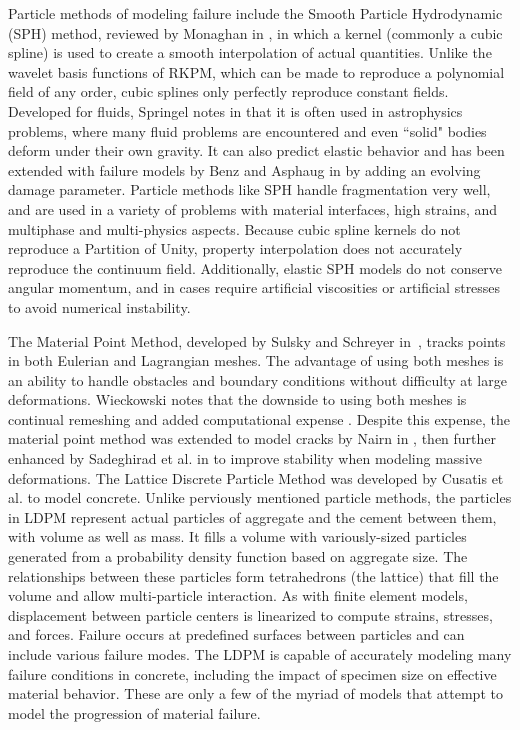 Particle methods of modeling failure include the Smooth Particle Hydrodynamic (SPH) method, reviewed by Monaghan in \cite{monaghan2005smoothed}, in which a kernel (commonly a cubic spline) is used to create a smooth interpolation of actual quantities.
Unlike the wavelet basis functions of RKPM, which can be made to reproduce a polynomial field of any order, cubic splines only perfectly reproduce constant fields.
Developed for fluids, Springel notes in \cite{springel2010smoothed} that it is often used in astrophysics problems, where many fluid problems are encountered and even ``solid" bodies deform under their own gravity.
It can also predict elastic behavior and has been extended with failure models by Benz and Asphaug in \cite{benz1995simulations} by adding an evolving damage parameter.
Particle methods like SPH handle fragmentation very well, and are used in a variety of problems with material interfaces, high strains, and multiphase and multi-physics aspects.
Because cubic spline kernels do not reproduce a Partition of Unity, property interpolation does not accurately reproduce the continuum field.
Additionally, elastic SPH models do not conserve angular momentum, and in cases require artificial viscosities or artificial stresses to avoid numerical instability.

The Material Point Method, developed by Sulsky and Schreyer in~\cite{sulsky1996axisymmetric}, tracks points in both Eulerian and Lagrangian meshes.
The advantage of using both meshes is an ability to handle obstacles and boundary conditions without difficulty at large deformations.
Wieckowski notes that the downside to using both meshes is continual remeshing and added computational expense \cite{wikeckowski2004material}.
Despite this expense, the material point method was extended to model cracks by Nairn in \cite{nairn2003material}, then further enhanced by Sadeghirad et al. in \cite{sadeghirad2011convected} to improve stability when modeling massive deformations.
The Lattice Discrete Particle Method was developed by Cusatis et al.\cite{cusatis2011lattice,cusatis2011blattice} to model concrete.
Unlike perviously mentioned particle methods, the particles in LDPM represent actual particles of aggregate and the cement between them, with volume as well as mass.
It fills a volume with variously-sized particles generated from a probability density function based on aggregate size.
The relationships between these particles form tetrahedrons (the lattice) that fill the volume and allow multi-particle interaction.
As with finite element models, displacement between particle centers is linearized to compute strains, stresses, and forces.
Failure occurs at predefined surfaces between particles and can include various failure modes.
The LDPM is capable of accurately modeling many failure conditions in concrete, including the impact of specimen size on effective material behavior.
These are only a few of the myriad of models that attempt to model the progression of material failure.

